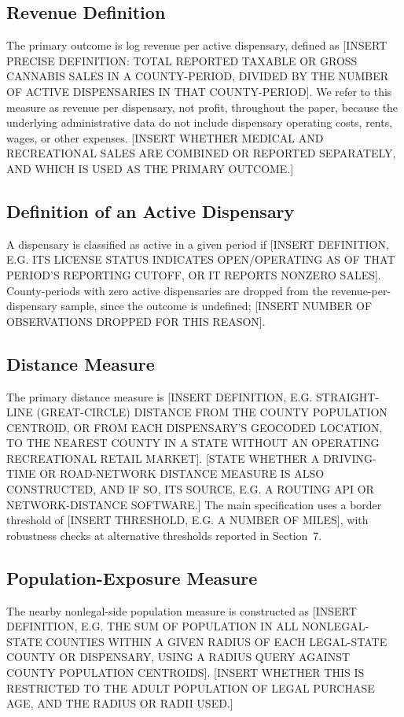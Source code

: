 \documentclass[12pt]{article}
\begin{document}
\subsection{Revenue Definition}
The primary outcome is log revenue per active dispensary, defined as [INSERT PRECISE DEFINITION: TOTAL
REPORTED TAXABLE OR GROSS CANNABIS SALES IN A COUNTY-PERIOD, DIVIDED BY THE NUMBER OF ACTIVE DISPENSARIES IN
THAT COUNTY-PERIOD]. We refer to this measure as revenue per dispensary, not profit, throughout the paper,
because the underlying administrative data do not include dispensary operating costs, rents, wages, or
other expenses. [INSERT WHETHER MEDICAL AND RECREATIONAL SALES ARE COMBINED OR REPORTED SEPARATELY, AND
WHICH IS USED AS THE PRIMARY OUTCOME.]

\subsection{Definition of an Active Dispensary}
A dispensary is classified as active in a given period if [INSERT DEFINITION, E.G. ITS LICENSE STATUS
INDICATES OPEN/OPERATING AS OF THAT PERIOD'S REPORTING CUTOFF, OR IT REPORTS NONZERO SALES]. County-periods
with zero active dispensaries are dropped from the revenue-per-dispensary sample, since the outcome is
undefined; [INSERT NUMBER OF OBSERVATIONS DROPPED FOR THIS REASON].

\subsection{Distance Measure}
The primary distance measure is [INSERT DEFINITION, E.G. STRAIGHT-LINE (GREAT-CIRCLE) DISTANCE FROM THE
COUNTY POPULATION CENTROID, OR FROM EACH DISPENSARY'S GEOCODED LOCATION, TO THE NEAREST COUNTY IN A STATE
WITHOUT AN OPERATING RECREATIONAL RETAIL MARKET]. [STATE WHETHER A DRIVING-TIME OR ROAD-NETWORK DISTANCE
MEASURE IS ALSO CONSTRUCTED, AND IF SO, ITS SOURCE, E.G. A ROUTING API OR NETWORK-DISTANCE SOFTWARE.] The
main specification uses a border threshold of [INSERT THRESHOLD, E.G. A NUMBER OF MILES], with robustness
checks at alternative thresholds reported in Section~7.

\subsection{Population-Exposure Measure}
The nearby nonlegal-side population measure is constructed as [INSERT DEFINITION, E.G. THE SUM OF POPULATION
IN ALL NONLEGAL-STATE COUNTIES WITHIN A GIVEN RADIUS OF EACH LEGAL-STATE COUNTY OR DISPENSARY, USING A
RADIUS QUERY AGAINST COUNTY POPULATION CENTROIDS]. [INSERT WHETHER THIS IS RESTRICTED TO THE ADULT
POPULATION OF LEGAL PURCHASE AGE, AND THE RADIUS OR RADII USED.]
\end{document}
